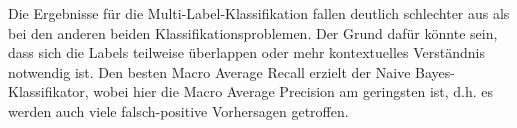 Die Ergebnisse für die Multi-Label-Klassifikation fallen deutlich schlechter aus als bei den anderen beiden Klassifikationsproblemen. Der Grund dafür könnte sein, dass sich die Labels teilweise überlappen oder mehr kontextuelles Verständnis notwendig ist. Den besten Macro Average Recall erzielt der Naive Bayes-Klassifikator, wobei hier die Macro Average Precision am geringsten ist, d.h. es werden auch viele falsch-positive Vorhersagen getroffen.

